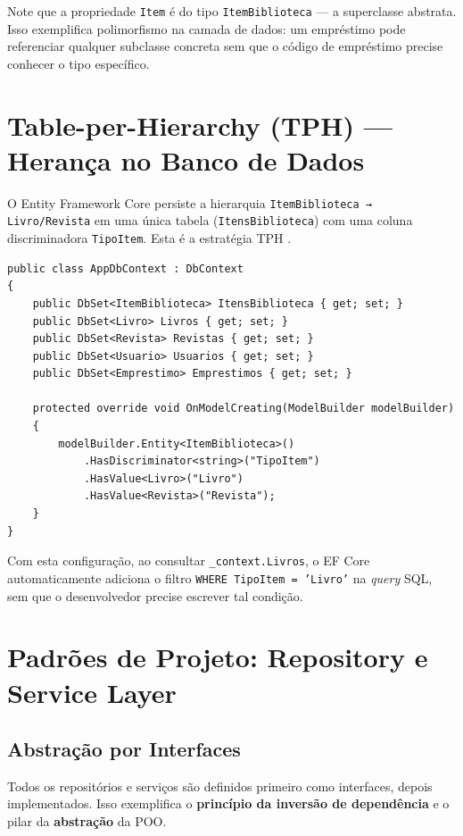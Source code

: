 \documentclass[
  12pt,
  a4paper,
  oneside,
  brazil
]{abntex2}
\begin{document}
Note que a propriedade \texttt{Item} é do tipo \texttt{ItemBiblioteca} — a superclasse abstrata. Isso exemplifica polimorfismo na camada de dados: um empréstimo pode referenciar qualquer subclasse concreta sem que o código de empréstimo precise conhecer o tipo específico.

\section{Table-per-Hierarchy (TPH) — Herança no Banco de Dados}

O Entity Framework Core persiste a hierarquia \texttt{ItemBiblioteca → Livro/Revista} em uma única tabela (\texttt{ItensBiblioteca}) com uma coluna discriminadora \texttt{TipoItem}. Esta é a estratégia TPH \cite{smith2021}.

\begin{lstlisting}[style=csharp, caption={Configuração TPH no AppDbContext}, label=lst:dbcontext]
public class AppDbContext : DbContext
{
    public DbSet<ItemBiblioteca> ItensBiblioteca { get; set; }
    public DbSet<Livro> Livros { get; set; }
    public DbSet<Revista> Revistas { get; set; }
    public DbSet<Usuario> Usuarios { get; set; }
    public DbSet<Emprestimo> Emprestimos { get; set; }

    protected override void OnModelCreating(ModelBuilder modelBuilder)
    {
        modelBuilder.Entity<ItemBiblioteca>()
            .HasDiscriminator<string>("TipoItem")
            .HasValue<Livro>("Livro")
            .HasValue<Revista>("Revista");
    }
}
\end{lstlisting}

Com esta configuração, ao consultar \texttt{\_context.Livros}, o EF Core automaticamente adiciona o filtro \texttt{WHERE TipoItem = 'Livro'} na \textit{query} SQL, sem que o desenvolvedor precise escrever tal condição.

\section{Padrões de Projeto: Repository e Service Layer}

\subsection{Abstração por Interfaces}

Todos os repositórios e serviços são definidos primeiro como interfaces, depois implementados. Isso exemplifica o \textbf{princípio da inversão de dependência} e o pilar da \textbf{abstração} da POO.
\end{document}
